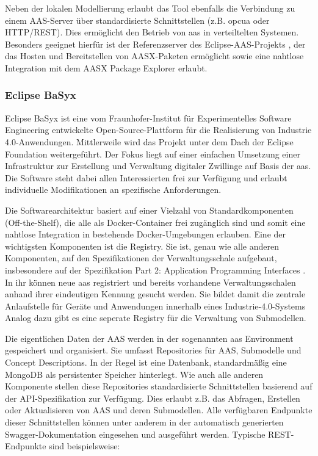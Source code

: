 Neben der lokalen Modellierung erlaubt das Tool ebenfalls die Verbindung zu einem AAS-Server über standardisierte Schnittstellen (z.B. \acs{opcua} oder HTTP/REST).
Dies ermöglicht den Betrieb von \acs{aas} in verteiltelten Systemen.
Besonders geeignet hierfür ist der Referenzserver des Eclipse-AAS-Projekts \cite{AASXServer}, der das Hosten und Bereitstellen von AASX-Paketen ermöglicht sowie eine nahtlose Integration mit dem AASX Package Explorer erlaubt.

\subsubsection{Eclipse BaSyx }
Eclipse BaSyx ist eine vom Fraunhofer-Institut für Experimentelles Software Engineering entwickelte Open-Source-Plattform für die Realisierung von Industrie 4.0-Anwendungen.
Mittlerweile wird das Projekt unter dem Dach der Eclipse Foundation weitergeführt.
Der Fokus liegt auf einer einfachen Umsetzung einer Infrastruktur zur Erstellung und Verwaltung digitaler Zwillinge auf Basis der \acs{aas}.
Die Software steht dabei allen Interessierten frei zur Verfügung und erlaubt individuelle Modifikationen an spezifische Anforderungen.

Die Softwarearchitektur basiert auf einer Vielzahl von Standardkomponenten (Off-the-Shelf), die alle als Docker-Container frei zugänglich sind und somit eine nahtlose Integration in bestehende Docker-Umgebungen erlauben.
Eine der wichtigsten Komponenten ist die Registry. 
Sie ist, genau wie alle anderen Komponenten, auf den Spezifikationen der Verwaltungsschale aufgebaut, insbesondere auf der Spezifikation Part 2: Application Programming Interfaces \cite{SpezifikationPart2}.
In ihr können neue \acs{aas} registriert und bereits vorhandene Verwaltungsschalen anhand ihrer eindeutigen Kennung gesucht werden.
Sie bildet damit die zentrale Anlaufstelle für Geräte und Anwendungen innerhalb eines Industrie-4.0-Systems
Analog dazu gibt es eine seperate Registry für die Verwaltung von Submodellen.

Die eigentlichen Daten der AAS werden in der sogenannten \acs{aas} Environment gespeichert und organisiert.
Sie umfasst Repositories für AAS, Submodelle und Concept Descriptions.
In der Regel ist eine Datenbank, standardmäßig eine MongoDB als persistenter Speicher hinterlegt.
Wie auch alle anderen Komponente stellen diese Repositories standardisierte Schnittstellen basierend auf der API-Spezifikation zur Verfügung.
Dies erlaubt z.B. das Abfragen, Erstellen oder Aktualisieren von AAS und deren Submodellen.
Alle verfügbaren Endpunkte dieser Schnittstellen können unter anderem in der automatisch generierten Swagger-Dokumentation eingesehen und ausgeführt werden. 
Typische REST-Endpunkte sind beispielsweise:

